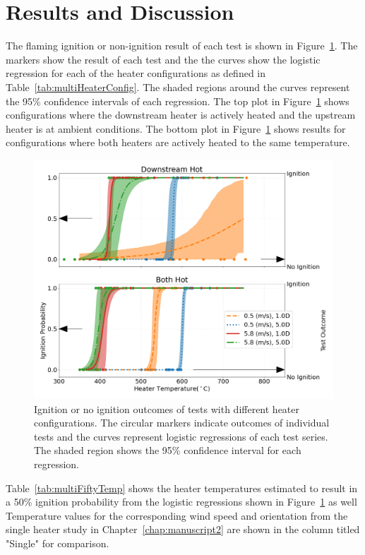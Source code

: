     
\section{Results and Discussion}
    The flaming ignition or non-ignition result of each test is shown in Figure~\ref{fig:multi_heater_hot_vs_ambient}. The markers show the result of each test and the the curves show the logistic regression for each of the heater configurations as defined in Table~\ref{tab:multiHeaterConfig}. The shaded regions around the curves represent the 95\% confidence intervals of each regression. The top plot in Figure~\ref{fig:multi_heater_hot_vs_ambient} shows configurations where the downstream heater is actively heated and the upstream heater is at ambient conditions. The bottom plot in Figure~\ref{fig:multi_heater_hot_vs_ambient} shows results for configurations where both heaters are actively heated to the same temperature.
        \begin{figure}[hpbt]
            \centering
            \includegraphics[width=0.75\columnwidth]{Figures/multi_heater_plot.png}
            \caption{Ignition or no ignition outcomes of tests with different heater configurations. The circular markers indicate outcomes of individual tests and the curves represent logistic regressions of each test series. The shaded region shows the 95\% confidence interval for each regression.}
            \label{fig:multi_heater_hot_vs_ambient}
        \end{figure}
    Table~\ref{tab:multiFiftyTemp} shows the heater temperatures estimated to result in a 50\% ignition probability from the logistic regressions shown in Figure~\ref{fig:multi_heater_hot_vs_ambient} as well  Temperature values for the corresponding wind speed and orientation from the single heater study in Chapter~\ref{chap:manuscript2} are shown in the column titled "Single" for comparison. 
